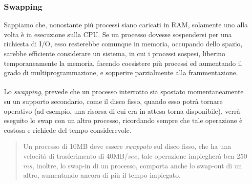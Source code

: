 \documentclass[12pt, letterpaper]{article}
\newcommand{\acc}{\\\hphantom{}\\}
\begin{document}
\subsubsection{Swapping}\label{swapping}
Sappiamo che, nonostante più processi siano caricati in RAM, solamente uno alla volta è in esecuzione 
sulla CPU. Se un processo dovesse sospendersi per una richiesta di I/O, esso resterebbe comunque in memoria, occupando 
dello spazio, sarebbe efficiente considerare un sistema, in cui i processi sospesi, liberino temporaneamente la memoria, 
facendo coesistere più processi ed aumentando il grado di multiprogrammazione, e sopperire parzialmente alla frammentazione.\acc 
Lo \textit{swapping}, prevede che un processo interrotto sia spostato momentaneamente su un supporto secondario, come il 
disco fisso, quando esso potrà tornare operativo (ad esempio, una risorsa di cui era in attesa torna disponibile), verrà 
eseguito lo swap con un altro processo, ricordando sempre che tale operazione è costosa e richiede del tempo considerevole.
\begin{quote}
    \color{gray} Un processo di 10MB deve essere \textit{swappato} sul disco fisso, che ha una velocità 
    di trasferimento di 40MB/\(sec\), tale operazione impiegherà ben 250\(ms\), inoltre, lo swap-in di un processo, 
    comporta anche lo swap-out di un altro, aumentando ancora di più il tempo impiegato. 
\end{quote}
\end{document}
